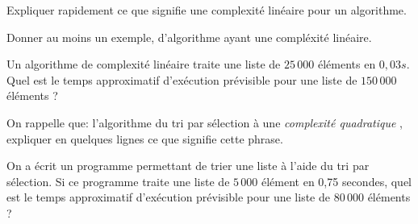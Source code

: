 \documentclass[11pt,a4paper]{article}
\begin{document}
\vspace{0.2cm}

\QListe
\item Expliquer rapidement ce que signifie une complexité linéaire pour un algorithme.
\item Donner au moins un exemple, d'algorithme ayant une compléxité linéaire.
\item Un algorithme de complexité linéaire traite une liste de $25\,000$ éléments en $0,03s$. Quel est le temps approximatif d'exécution prévisible pour une liste de $150\,000$ éléments ?
\item On rappelle que: \og l'algorithme du tri par sélection à une \textit{complexité quadratique} \fg, expliquer en quelques lignes ce que signifie cette phrase.
\item On a écrit un programme permettant de trier une liste à l'aide du tri par sélection. Si ce programme traite une liste de $5\,000$ élément en 0,75 secondes, quel est le temps approximatif d'exécution prévisible pour une liste de $80\,000$ éléments ?
\FinListe
\end{document}
